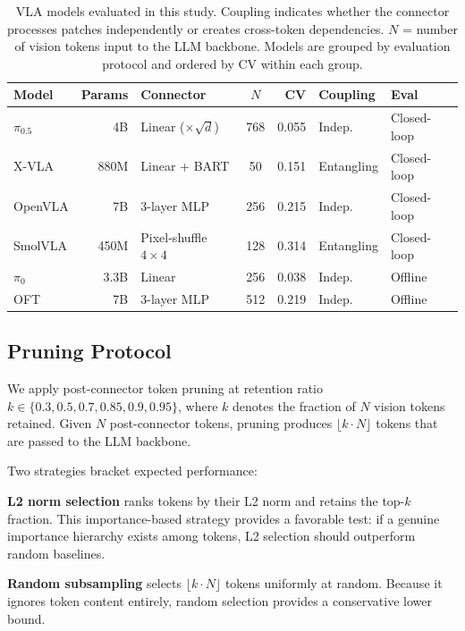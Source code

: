 \begin{table}[t]
\centering
\small
\caption{VLA models evaluated in this study. Coupling indicates whether the connector processes patches independently or creates cross-token dependencies. $N$ = number of vision tokens input to the LLM backbone. Models are grouped by evaluation protocol and ordered by CV within each group.}
\label{tab:model_properties}
\begin{tabular}{lrlcrll}
\toprule
Model & Params & Connector & $N$ & CV & Coupling & Eval \\
\midrule
$\pi_0.5$ & 4B & Linear ($\times\!\sqrt{d}$) & 768 & 0.055 & Indep.\ & Closed-loop \\
X-VLA & 880M & Linear + BART & 50 & 0.151 & Entangling & Closed-loop \\
OpenVLA & 7B & 3-layer MLP & 256 & 0.215 & Indep.\ & Closed-loop \\
SmolVLA & 450M & Pixel-shuffle $4{\times}4$ & 128 & 0.314 & Entangling & Closed-loop \\
\midrule
$\pi_0$ & 3.3B & Linear & 256 & 0.038 & Indep.\ & Offline \\
OFT & 7B & 3-layer MLP & 512 & 0.219 & Indep.\ & Offline \\
\bottomrule
\end{tabular}
\end{table}

\subsection{Pruning Protocol}
\label{sec:pruning_protocol}

We apply post-connector token pruning at retention ratio $k \in \{0.3, 0.5, 0.7, 0.85, 0.9, 0.95\}$, where $k$ denotes the fraction of $N$ vision tokens retained. Given $N$ post-connector tokens, pruning produces $\lfloor k \cdot N \rfloor$ tokens that are passed to the LLM backbone.

Two strategies bracket expected performance:

\textbf{L2 norm selection} ranks tokens by their L2 norm and retains the top-$k$ fraction. This importance-based strategy provides a favorable test: if a genuine importance hierarchy exists among tokens, L2 selection should outperform random baselines.

\textbf{Random subsampling} selects $\lfloor k \cdot N \rfloor$ tokens uniformly at random. Because it ignores token content entirely, random selection provides a conservative lower bound.

